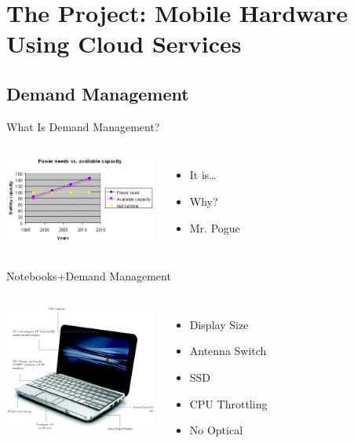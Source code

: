 \documentclass{beamer}
\begin{document}
\section[Research Project]{The Project: Mobile Hardware Using Cloud Services}

\subsection{Demand Management}

\begin{frame}{What Is Demand Management? }
  \begin{columns}
    \column{5cm}
      \includegraphics[width=5cm]{demandGraph.png}
    \column{5cm}
    \begin{itemize}
    \item It is\dots
    \item Why?
    \item Mr. Pogue
    \end{itemize}
  \end{columns}
\end{frame}

\begin{frame}{Notebooks+Demand Management}
  \begin{columns}
    \column{5cm}
      \includegraphics[width=5cm]{netbookDiagram.jpg}
    \column{5cm}
    \begin{itemize}
    \item Display Size
    \item Antenna Switch
    \item SSD
    \item CPU Throttling
    \item No Optical
    \end{itemize}
  \end{columns}
\end{frame}
\end{document}
